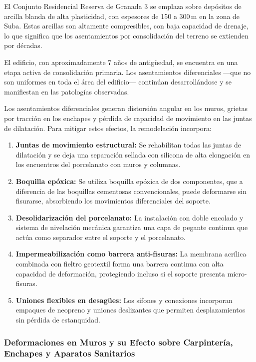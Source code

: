﻿\documentclass[12pt]{article}
\begin{document}
El Conjunto Residencial Reserva de Granada 3 se emplaza sobre depósitos de arcilla
blanda de alta plasticidad, con espesores de 150 a 300\,m en la zona de Suba. Estas
arcillas son altamente compresibles, con baja capacidad de drenaje, lo que significa
que los asentamientos por consolidación del terreno se extienden por décadas.

El edificio, con aproximadamente 7 años de antigüedad, se encuentra en una etapa
activa de consolidación primaria. Los asentamientos diferenciales —que no son
uniformes en toda el área del edificio— continúan desarrollándose y se manifiestan
en las patologías observadas.

Los asentamientos diferenciales generan distorsión angular en los muros, grietas
por tracción en los enchapes y pérdida de capacidad de movimiento en las juntas de
dilatación. Para mitigar estos efectos, la remodelación incorpora:

\begin{enumerate}[noitemsep]
  \item {\bfseries Juntas de movimiento estructural:} Se rehabilitan todas las juntas
  de dilatación y se deja una separación sellada con silicona de alta elongación en
  los encuentros del porcelanato con muros y columnas.
  \item {\bfseries Boquilla epóxica:} Se utiliza boquilla epóxica de dos componentes,
  que a diferencia de las boquillas cementosas convencionales, puede deformarse sin
  fisurarse, absorbiendo los movimientos diferenciales del soporte.
  \item {\bfseries Desolidarización del porcelanato:} La instalación con doble encolado
  y sistema de nivelación mecánica garantiza una capa de pegante continua que actúa
  como separador entre el soporte y el porcelanato.
  \item {\bfseries Impermeabilización como barrera anti-fisuras:} La membrana acrílica
  combinada con fieltro geotextil forma una barrera continua con alta capacidad de
  deformación, protegiendo incluso si el soporte presenta micro-fisuras.
  \item {\bfseries Uniones flexibles en desagües:} Los sifones y conexiones incorporan
  empaques de neopreno y uniones deslizantes que permiten desplazamientos sin pérdida
  de estanquidad.
\end{enumerate}

\subsubsection{Deformaciones en Muros y su Efecto sobre Carpintería, Enchapes y Aparatos Sanitarios}
\end{document}
